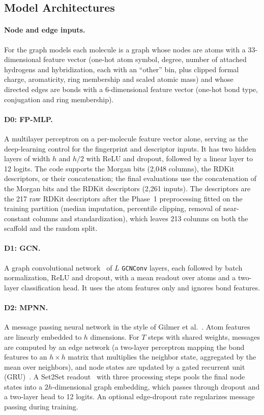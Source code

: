 \subsection{Model Architectures}
\paragraph{Node and edge inputs.}
For the graph models each molecule is a graph whose nodes are atoms with a 33-dimensional feature vector (one-hot atom symbol, degree, number of attached hydrogens and hybridization, each with an ``other'' bin, plus clipped formal charge, aromaticity, ring membership and scaled atomic mass) and whose directed edges are bonds with a 6-dimensional feature vector (one-hot bond type, conjugation and ring membership).

\paragraph{D0: FP-MLP.}
A multilayer perceptron on a per-molecule feature vector alone, serving as the deep-learning control for the fingerprint and descriptor inputs. It has two hidden layers of width $h$ and $h/2$ with ReLU and dropout, followed by a linear layer to 12 logits. The code supports the Morgan bits (2,048 columns), the RDKit descriptors, or their concatenation; the final evaluations use the concatenation of the Morgan bits and the RDKit descriptors (2,261 inputs). The descriptors are the 217 raw RDKit descriptors after the Phase~1 preprocessing fitted on the training partition (median imputation, percentile clipping, removal of near-constant columns and standardization), which leaves 213 columns on both the scaffold and the random split.

\paragraph{D1: GCN.}
A graph convolutional network~\cite{kipf2017gcn} of $L$ \texttt{GCNConv} layers, each followed by batch normalization, ReLU and dropout, with a mean readout over atoms and a two-layer classification head. It uses the atom features only and ignores bond features.

\paragraph{D2: MPNN.}
A message passing neural network in the style of Gilmer et al.~\cite{gilmer2017neural}. Atom features are linearly embedded to $h$ dimensions. For $T$ steps with shared weights, messages are computed by an edge network (a two-layer perceptron mapping the bond features to an $h \times h$ matrix that multiplies the neighbor state, aggregated by the mean over neighbors), and node states are updated by a gated recurrent unit (GRU)~\cite{cho2014gru}. A Set2Set readout~\cite{vinyals2016set2set} with three processing steps pools the final node states into a $2h$-dimensional graph embedding, which passes through dropout and a two-layer head to 12 logits. An optional edge-dropout rate regularizes message passing during training.

